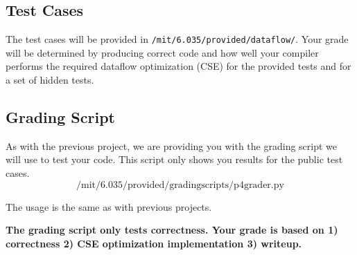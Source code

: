 \subsection*{Test Cases}

The test cases will be provided in {\tt /mit/6.035/provided/dataflow/}.
Your grade will be determined by producing correct code and how well your
compiler performs the required dataflow optimization (CSE) for the provided
tests and for a set of hidden tests.

\subsection*{Grading Script}

As with the previous project, we are providing you with the grading script
we will use to test your code.  This script only shows you results for the
public test cases.  \[ \mbox{/mit/6.035/provided/gradingscripts/p4grader.py} \]

The usage is the same as with previous projects.

{\bf The grading script only tests correctness.  Your grade is based on 1) correctness
2) CSE optimization implementation 3) writeup.}


